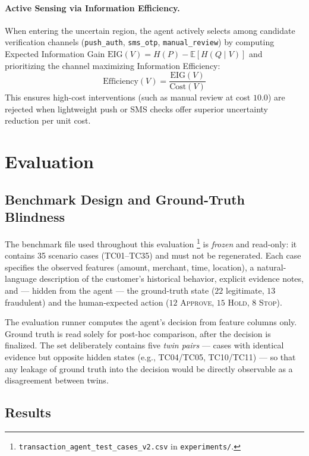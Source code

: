 \documentclass{article}
\begin{document}
\paragraph{Active Sensing via Information Efficiency.}
When entering the uncertain region, the agent actively selects among candidate verification channels (\texttt{push\_auth}, \texttt{sms\_otp}, \texttt{manual\_review}) by computing Expected Information Gain $\text{EIG}(V) = H(P) - \mathbb{E}[H(Q \mid V)]$ and prioritizing the channel maximizing Information Efficiency:
\begin{equation}
\text{Efficiency}(V) = \frac{\text{EIG}(V)}{\text{Cost}(V)}
\end{equation}
This ensures high-cost interventions (such as manual review at cost $10.0$) are rejected when lightweight push or SMS checks offer superior uncertainty reduction per unit cost.

\section{Evaluation}

\subsection{Benchmark Design and Ground-Truth Blindness}

The benchmark file used throughout this evaluation%
\footnote{\texttt{transaction\_agent\_test\_cases\_v2.csv} in \texttt{experiments/}.} is
\emph{frozen} and read-only:
it contains 35 scenario
cases (TC01--TC35) and must not be regenerated. Each case specifies the
observed features
(amount, merchant, time, location), a natural-language description of the
customer's historical behavior, explicit evidence notes, and --- hidden from
the agent --- the ground-truth state ($22$ legitimate, $13$ fraudulent) and the
human-expected action ($12$ \textsc{Approve}, $15$ \textsc{Hold},
$8$ \textsc{Stop}).

The evaluation runner computes the agent's decision from feature columns only.
Ground truth is read solely for post-hoc comparison, after the decision is
finalized. The set deliberately contains five \emph{twin pairs} --- cases with
identical evidence but opposite hidden states (e.g., TC04/TC05, TC10/TC11) ---
so that any leakage of ground truth into the decision would be directly
observable as a disagreement between twins.

\subsection{Results}
\end{document}
